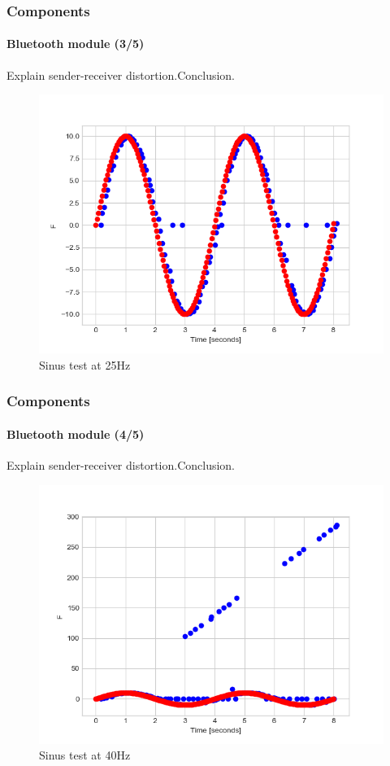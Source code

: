 \documentclass[10pt]{beamer}
\begin{document}
\begin{frame}
\frametitle{Components}
\framesubtitle{Bluetooth module (3/5)}
Explain sender-receiver distortion.Conclusion.
\begin{figure}[hbtp]
\centering
\includegraphics[scale=0.45]{figures/sin-sending-merged-25hz.png}
\caption{Sinus test at 25Hz}
\end{figure}

\end{frame}


\begin{frame}
\frametitle{Components}
\framesubtitle{Bluetooth module (4/5)}
Explain sender-receiver distortion.Conclusion.
\begin{figure}[hbtp]
\centering
\includegraphics[scale=0.45]{figures/sin-sending-merged-40hz.png}
\caption{Sinus test at 40Hz}
\end{figure}

\end{frame}
\end{document}
